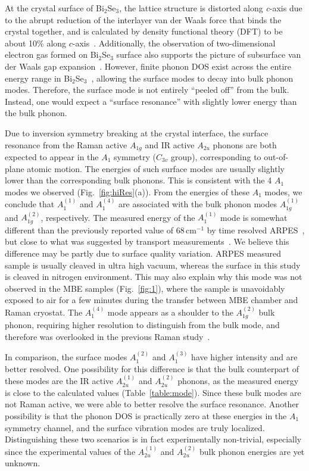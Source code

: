 \documentclass[reprint,aps,pra,superscriptaddress,amsmath,amssymb,linenumbers,longbibliography]{revtex4-1}
\begin{document}
At the crystal surface of Bi$_2$Se$_3$, the lattice structure is distorted along \textit{c}-axis due to the abrupt reduction of the interlayer van der Waals force that binds the crystal together, and is calculated by density functional theory (DFT) to be about 10\% along $c$-axis~\cite{Sobota2014}.
Additionally, the observation of two-dimensional electron gas formed on Bi$_2$Se$_3$ surface also supports the picture of subsurface van der Waals gap expansion~\cite{Bianchi2010,Bianchi2012,Menshchikova2011}.
However, finite phonon DOS exist across the entire energy range in Bi$_2$Se$_3$~\cite{Wang2012}, allowing the surface modes to decay into bulk phonon modes.
Therefore, the surface mode is not entirely ``peeled off'' from the bulk.
Instead, one would expect a ``surface resonance'' with slightly lower energy than the bulk phonon.

Due to inversion symmetry breaking at the crystal interface, the surface resonance from the Raman active $A_{1g}$ and IR active $A_{2u}$ phonons are both expected to appear in the $A_1$ symmetry ($C_{3v}$ group), corresponding to out-of-plane atomic motion.
The energies of such surface modes are usually slightly lower than the corresponding bulk phonons.
This is consistent with the 4 $A_1$ modes we observed (Fig.~\ref{fig:hiRes}(a)).
From the energies of these $A_1$ modes, we conclude that $A_{1}^{(1)}$ and $A_{1}^{(4)}$ are associated with the bulk phonon modes $A_{1g}^{(1)}$ and $A_{1g}^{(2)}$, respectively.
The measured energy of the $A_{1}^{(1)}$ mode is somewhat different than the previously reported value of 68\,cm$^{-1}$ by time resolved ARPES~\cite{Sobota2014}, but close to what was suggested by transport measurements~\cite{Costache2014}.
We believe this difference may be partly due to surface quality variation. 
ARPES measured sample is usually cleaved in ultra high vacuum, whereas the surface in this study is cleaved in nitrogen environment.
This may also explain why this mode was not observed in the MBE samples (Fig.~\ref{fig:1}), where the sample is unavoidably exposed to air for a few minutes during the transfer between MBE chamber and Raman cryostat.
The $A_{1}^{(4)}$ mode appears as a shoulder to the $A_{1g}^{(2)}$ bulk phonon, requiring higher resolution to distinguish from the bulk mode, and therefore was overlooked in the previous Raman study~\cite{Gnezdilov2011}.

In comparison, the surface modes $A_{1}^{(2)}$ and $A_{1}^{(3)}$ have higher intensity and are better resolved.
One possibility for this difference is that the bulk counterpart of these modes are the IR active $A_{2u}^{(1)}$ and $A_{2u}^{(2)}$ phonons, as the measured energy is close to the calculated values (Table~\ref{table:mode}).
Since these bulk modes are not Raman active, we were able to better resolve the surface resonance.
Another possibility is that the phonon DOS is practically zero at these energies in the $A_1$ symmetry channel, and the surface vibration modes are truly localized.
Distinguishing these two scenarios is in fact experimentally non-trivial, especially since the experimental values of the $A_{2u}^{(1)}$ and $A_{2u}^{(2)}$ bulk phonon energies are yet unknown.
\end{document}
